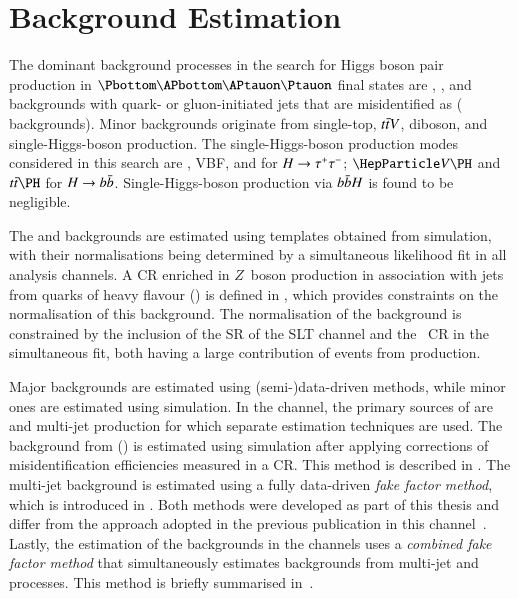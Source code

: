 \section{Background Estimation}%
\label{sec:background_estimation}

The dominant background processes in the search for Higgs boson pair production
in $\bbtautau$ final states are \Zjets, \ttbar, and backgrounds with quark- or
gluon-initiated jets that are misidentified as \tauhadvis (\faketauhadvisC
backgrounds).
Minor backgrounds originate from single-top, $t\bar{t} V$, diboson, and
single-Higgs-boson production.  The single-Higgs-boson production modes
considered in this search are \ggF, VBF, \VH and \ttH for $H \to \tau^{+} \tau^{-}$; $\VH$
and $\ttH$ for $H \to b\bar{b}$. Single-Higgs-boson production via $b\bar{b} H$ is
found to be negligible.

The \Zjets and \ttbar backgrounds are estimated using templates obtained from
simulation, with their normalisations being determined by a simultaneous
likelihood fit in all analysis channels. A CR enriched in $Z$~boson production
in association with jets from quarks of heavy flavour (\ZHF) is defined in
, which provides constraints on the normalisation of this
background. The normalisation of the \ttbar background is constrained by the
inclusion of the SR of the \lephad SLT channel and the \ZHF~CR in the
simultaneous fit, both having a large contribution of events from \ttbar
production.

Major \faketauhadvisC backgrounds are estimated using (semi-)data-driven methods,
while minor ones are estimated using simulation. In the \hadhad channel, the
primary sources of \faketauhadvis are \ttbar and multi-jet production for which
separate estimation techniques are used. The \faketauhadvisC background from
\ttbar (\ttbarFakes) is estimated using simulation after applying corrections of
\jettotauhadvis misidentification efficiencies measured in a CR. This method is
described in . The multi-jet background is
estimated using a fully data-driven \emph{fake factor method}, which is
introduced in . Both methods were developed as part of
this thesis and differ from the approach adopted in the previous publication in
this channel~\cite{HIGG-2016-16-witherratum}. Lastly, the estimation of the
\faketauhadvisC backgrounds in the \lephad channels uses a \emph{combined fake
  factor method} that simultaneously estimates \faketauhadvisC backgrounds from
multi-jet and \ttbar processes. This method is briefly summarised
in~.

